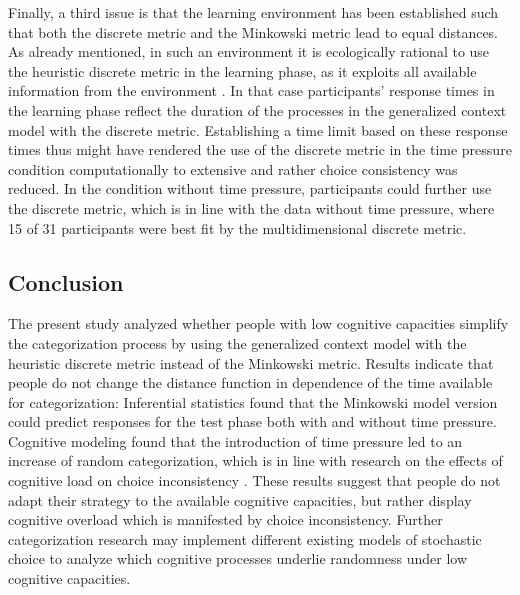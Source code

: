 \documentclass[a4paper,man,natbib]{apa6}
\begin{document}
Finally, a third issue is that the learning environment has been established such that both the discrete metric and the Minkowski metric lead to equal distances. As already mentioned, in such an environment it is ecologically rational to use the heuristic discrete metric in the learning phase, as it exploits all available information from the environment \citep{todd2007environments}. In that case participants' response times in the learning phase reflect the duration of the processes in the generalized context model with the discrete metric. Establishing a time limit based on these response times thus might have rendered the use of the discrete metric in the time pressure condition computationally to extensive and rather choice consistency was reduced. In the condition without time pressure, participants could further use the discrete metric, which is in line with the data without time pressure, where 15 of 31 participants were best fit by the multidimensional discrete metric.

\subsection{Conclusion}
The present study analyzed whether people with low cognitive capacities simplify the categorization process by using the generalized context model \citep{nosofsky1986attention} with the heuristic discrete metric instead of the Minkowski metric. Results indicate that people do not change the distance function in dependence of the time available for categorization: Inferential statistics found that the Minkowski model version could predict responses for the test phase both with and without time pressure. Cognitive modeling found that the introduction of time pressure led to an increase of random categorization, which is in line with research on the effects of cognitive load on choice inconsistency \citep{olschewski2018taxing}. These results suggest that people do not adapt their strategy to the available cognitive capacities, but rather display cognitive overload which is manifested by choice inconsistency. Further categorization research may implement different existing models of stochastic choice \citep{blavatskyy2010models, becker1963stochastic} to analyze which cognitive processes underlie  randomness under low cognitive capacities.


\end{document}
